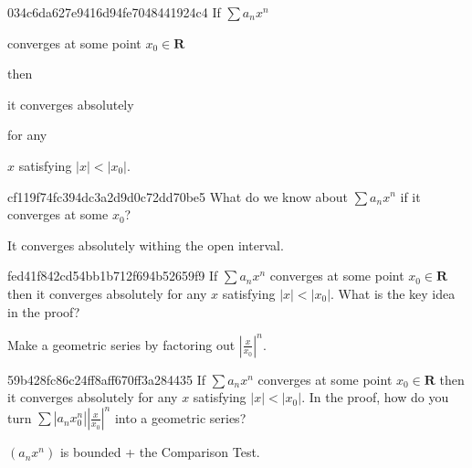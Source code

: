 \begin{note}{034c6da627e9416d94fe7048441924c4}
    If \({ \sum a_n x^{n} }\) \begin{icloze}{2}converges at some point \({ x_0 \in \mathbf{R} }\)\end{icloze} then \begin{icloze}{1}it converges absolutely\end{icloze} for any \begin{icloze}{3}\({ x }\) satisfying \({ \left\lvert x \right\rvert < \left\lvert x_0 \right\rvert }\).\end{icloze}
\end{note}

\begin{note}{cf119f74fc394dc3a2d9d0c72dd70be5}
    What do we know about \({ \sum a_n x^{n} }\) if it converges at some \({ x_0 }\)?

    \begin{cloze}{1}
        It converges absolutely withing the open interval.
    \end{cloze}
\end{note}

\begin{note}{fed41f842cd54bb1b712f694b52659f9}
    If \({ \sum a_n x^{n} }\) converges at some point \({ x_0 \in \mathbf{R} }\) then it converges absolutely for any \({ x }\) satisfying \({ \left\lvert x \right\rvert < \left\lvert x_0 \right\rvert }\).
    What is the key idea in the proof?

    \begin{cloze}{1}
        Make a geometric series by factoring out \({ \left\lvert \frac{x}{x_0} \right\rvert^{n} }\).
    \end{cloze}
\end{note}

\begin{note}{59b428fc86c24ff8aff670ff3a284435}
    If \({ \sum a_n x^{n} }\) converges at some point \({ x_0 \in \mathbf{R} }\) then it converges absolutely for any \({ x }\) satisfying \({ \left\lvert x \right\rvert < \left\lvert x_0 \right\rvert }\).
    In the proof, how do you turn \({ \sum \left\lvert a_n x_0^{n} \right\rvert \left\lvert \frac{x}{x_0} \right\rvert^{n} }\) into a geometric series?

    \begin{cloze}{1}
        \({ (a_n x^{n}) }\) is bounded + the Comparison Test.
    \end{cloze}
\end{note}

